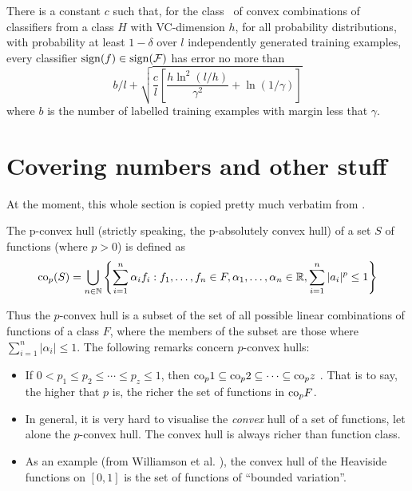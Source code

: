 There is a constant $c$ such that, for the class \calF\ of convex
combinations of classifiers from a class $H$ with VC-dimension $h$,
for all probability distributions, with probability at least
$1-\delta$ over $l$ independently generated training examples, every
classifier $\mathrm{sign}(f) \in \mathrm{sign}(\mathcal{F})$ has error no more than
\begin{equation}
b/l + \sqrt{\frac{c}{l} \left[ \frac{h \ln^2 (l/h)}{\gamma^2} +
\ln(1/\gamma) \right] }
\end{equation}
where $b$ is the number of labelled training examples with margin less
that $\gamma$.





\section{Covering numbers and other stuff}
At the moment, this whole section is copied pretty much verbatim from
\cite{Williamson99}.

The p-convex hull (strictly speaking, the p-absolutely convex hull) of
a set $S$ of functions (where $p>0$) is defined as
%
\begin{equation}
\mathrm{co}_p (S) =
 \bigcup _{n \in \mathbb{N}}
\left\{
 \sum_{i=1}^{n}
 \alpha _i
f_i : f_1, \ldots, f_n \in F,
 \alpha _1, \ldots, \alpha _n \in \mathbb{R},
 \sum_{i=1}^{n} | a_i |^p \leq 1
\right\}
\end{equation}

Thus the $p$-convex hull is a subset of the set of all possible linear
combinations of functions of a class $F$, where the members of the
subset are those where $\sum_{i=1}^n |\alpha_i| \leq 1$.  The
following remarks concern $p$-convex hulls:
%
\begin{itemize}
\item	If $0 < p_1 \leq p_2 \leq \cdots \leq p_z \leq 1$, then
	$\mathrm{co}_p 1 \subseteq \mathrm{co}_p 2 \subseteq \cdots \subseteq \mathrm{co}_p z$
	.  That is to say, the
	higher that $p$ is, the richer the set of functions in
	$\mathrm{co}_p{F}$.
\item	In general, it is very hard to visualise the \emph{convex} hull
	of a set of functions, let alone the $p$-convex hull.  The
	convex hull is always richer than function class.
\item	As an example (from Williamson et al. \cite{Williamson99}), the convex
	hull of the Heaviside functions on $[0, 1]$ is the set of
	functions of ``bounded variation''.
\end{itemize}










